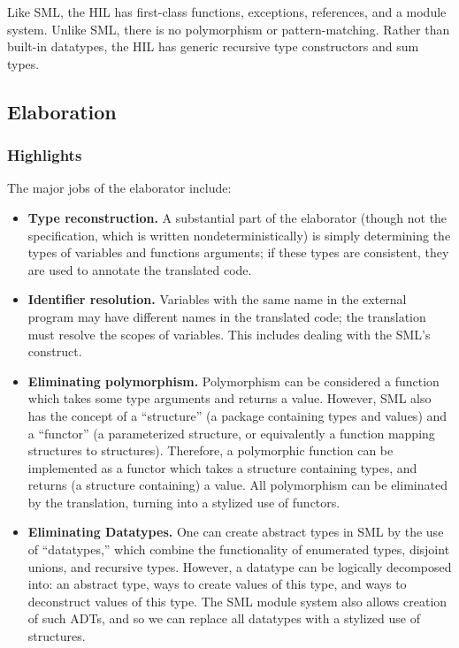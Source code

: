 \documentclass[twoside]{article}
\begin{document}
Like SML, the HIL has first-class functions, exceptions, references,
and a module system.  Unlike SML, there is no polymorphism or
pattern-matching.  Rather than built-in datatypes, the HIL has generic
recursive type constructors and sum types.

\subsection{Elaboration}

\subsubsection{Highlights}
The major jobs of the elaborator include:

\begin{itemize}
\item \textbf{Type reconstruction. } A substantial part
of the elaborator (though not the specification, which is written
nondeterministically) is simply determining the types of variables and
functions arguments; if these types are consistent, they are used to
annotate the translated code.

\item \textbf{Identifier resolution. }  Variables with the
same name in the external program may have different names in
the translated code; the translation must resolve the scopes
of variables.  This includes dealing with the SML's
 construct.

\item \textbf{Eliminating polymorphism. }  Polymorphism
can be considered a function which takes some type arguments and
returns a value.  However, SML also has the concept of a ``structure''
(a package containing types and values) and a ``functor'' (a
parameterized structure, or equivalently a function mapping structures
to structures).  Therefore, a polymorphic function can be implemented
as a functor which takes a structure containing types, and returns (a
structure containing) a value.  All polymorphism can be
eliminated by the translation, turning into a stylized use of
functors.

\item \textbf{Eliminating Datatypes. }  One can create abstract
types in SML by the use of ``datatypes,'' which combine the
functionality of enumerated types, disjoint unions, and recursive
types.  However, a datatype can be logically decomposed into: an
abstract type, ways to create values of this type, and ways to
deconstruct values of this type.  The SML module
system also allows creation of such ADTs, and so we can replace all
datatypes with a stylized use of structures.


\end{itemize}
\end{document}
